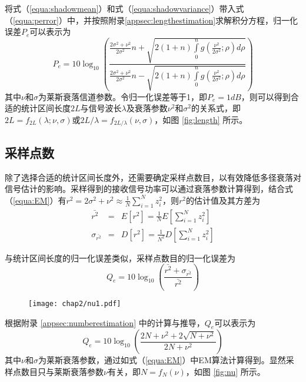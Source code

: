 将式（\ref{equa:shadowmean}）和式（\ref{equa:shadowvariance}）带入式（\ref{equa:perror}）中，并按照附录\ref{appsec:lengthestimation}求解积分方程，归一化误差$P_e$可以表示为
\begin{equation}
P_e = 10 \log_{10}\left(\frac{\frac{2\sigma^2+\nu^2}{2\sigma^2}n+\sqrt{2(1+n)\int\limits_0^n g\left(\frac{\nu^2}{2\sigma^2};\rho\right) d\rho}}{\frac{2\sigma^2+\nu^2}{2\sigma^2}n-\sqrt{2(1+n)\int\limits_0^n g\left(\frac{\nu^2}{2\sigma^2};\rho\right) d\rho}}\right)
\label{equa:Perror}
\end{equation}
其中$\nu$和$\sigma$为莱斯衰落信道参数。令归一化误差等于1，即$P_e=1dB$，则可以得到合适的统计区间长度$2L$与信号波长$\lambda$及衰落参数$\nu^2$和$\sigma^2$的关系式，即$2L=f_{2L}(\lambda;\nu,\sigma)$或$2L/\lambda=f_{2L/\lambda}(\nu,\sigma)$，如图 \ref{fig:length} 所示。

\subsection{采样点数}
\label{sec:number}

除了选择合适的统计区间长度外，还需要确定采样点数目，以有效降低多径衰落对信号估计的影响。采样得到的接收信号功率可以通过衰落参数计算得到，结合式（\ref{equa:EM}）有$r^2=2\sigma^2+\nu^2\approx\frac{1}{N}\sum_{i=1}^N z_i^2$，则$r^2$的估计值及其方差为
\begin{subequations}
  \begin{eqnarray}
    \bar{r^2}&=&E\left[r^2\right]=\frac{1}{N}E\left[\sum_{i=1}^{N}z_i^2\right] \\
    \sigma_{\bar{r^2}}&=&D\left[r^2\right]=\frac{1}{N^2}D\left[\sum_{i=1}^{N}z_i^2\right]
  \end{eqnarray}
\label{equa:number}
\end{subequations}

与统计区间长度的归一化误差类似，采样点数目的归一化误差为
\begin{equation}
Q_e=10 \log_{10}\left(\frac{\bar{r^2}+\sigma_{\bar{r^2}}}{\bar{r^2}}\right)
\label{equa:qerror}
\end{equation}

\begin{figure}[!htp]
\centerline{
\texttt{[image: chap2/nu1.pdf]}
}
\end{figure}

根据附录 \ref{appsec:numberestimation} 中的计算与推导，$Q_e$可以表示为
\begin{equation}
    Q_e=10 \log_{10}\left(\frac{2N+\nu^2+2\sqrt{N+\nu^2}}{2N+\nu^2}\right)
\label{equa:Qerror}
\end{equation}
其中$\nu$和$\sigma$为莱斯衰落参数，通过如式（\ref{equa:EM}）中EM算法计算得到。显然采样点数目只与莱斯衰落参数$\nu$有关，即$N=f_{N}(\nu)$，如图 \ref{fig:nu} 所示。

